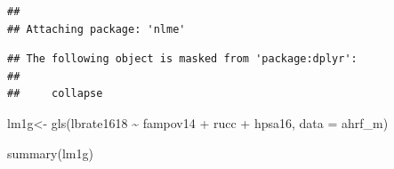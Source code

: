 \documentclass[
]{article}
\newenvironment{Shaded}{\begin{snugshade}}{\end{snugshade}}
\newcommand{\AttributeTok}[1]{\textcolor[rgb]{0.77,0.63,0.00}{#1}}
\newcommand{\FunctionTok}[1]{\textcolor[rgb]{0.00,0.00,0.00}{#1}}
\newcommand{\NormalTok}[1]{#1}
\newcommand{\OtherTok}[1]{\textcolor[rgb]{0.56,0.35,0.01}{#1}}
\newcommand{\SpecialCharTok}[1]{\textcolor[rgb]{0.00,0.00,0.00}{#1}}
\begin{document}
\begin{verbatim}
## 
## Attaching package: 'nlme'
\end{verbatim}

\begin{verbatim}
## The following object is masked from 'package:dplyr':
## 
##     collapse
\end{verbatim}

\begin{Shaded}
\begin{Highlighting}[]
\NormalTok{lm1g}\OtherTok{\textless{}{-}} \FunctionTok{gls}\NormalTok{(lbrate1618 }\SpecialCharTok{\textasciitilde{}}\NormalTok{  fampov14 }\SpecialCharTok{+}\NormalTok{ rucc }\SpecialCharTok{+}\NormalTok{ hpsa16,}
          \AttributeTok{data =}\NormalTok{ ahrf\_m)}

\FunctionTok{summary}\NormalTok{(lm1g)}
\end{Highlighting}
\end{Shaded}
\end{document}
